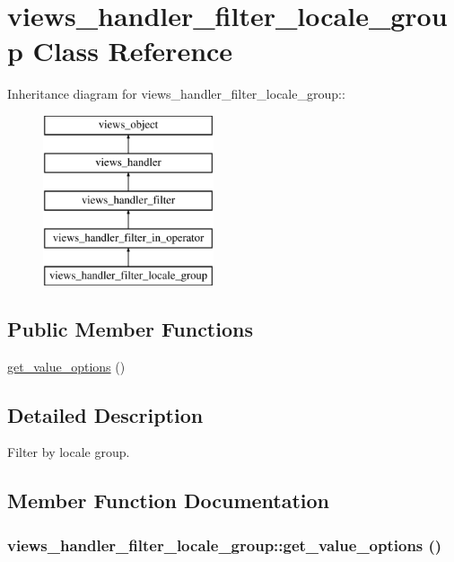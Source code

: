 \hypertarget{classviews__handler__filter__locale__group}{
\section{views\_\-handler\_\-filter\_\-locale\_\-group Class Reference}
\label{classviews__handler__filter__locale__group}
}
Inheritance diagram for views\_\-handler\_\-filter\_\-locale\_\-group::\begin{figure}[H]
\begin{center}
\leavevmode
\includegraphics[height=5cm]{classviews__handler__filter__locale__group}
\end{center}
\end{figure}
\subsection*{Public Member Functions}
\begin{CompactItemize}
\item 
\hyperlink{classviews__handler__filter__locale__group_605b3625db570715d94299f05200a9c7}{get\_\-value\_\-options} ()
\end{CompactItemize}


\subsection{Detailed Description}
Filter by locale group. 

\subsection{Member Function Documentation}
\hypertarget{classviews__handler__filter__locale__group_605b3625db570715d94299f05200a9c7}{
\subsubsection[{get\_\-value\_\-options}]{\setlength{\rightskip}{0pt plus 5cm}views\_\-handler\_\-filter\_\-locale\_\-group::get\_\-value\_\-options ()}}
\label{classviews__handler__filter__locale__group_605b3625db570715d94299f05200a9c7}


